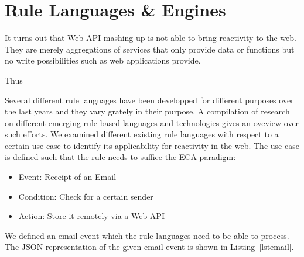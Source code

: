 




\section{Rule Languages \& Engines}

It turns out that Web API mashing up is not able to bring reactivity to the web.
They are merely aggregations of services that only provide data or functions but no write possibilities such as web applications provide.

Thus 





Several different rule languages have been developped for different purposes over the last years and they vary grately in their purpose.
A compilation of research on different emerging rule-based languages and technologies \cite{2009-Paschke_Boley-RCER.pdf} gives an oveview over such efforts.
We examined different existing rule languages with respect to a certain use case to identify its applicability for reactivity in the web. %
The use case is defined such that the rule needs to suffice the ECA paradigm:

\begin{itemize}
  \item Event: Receipt of an Email
  \item Condition: Check for a certain sender
  \item Action: Store it remotely via a Web API
\end{itemize}

We defined an email event which the rule languages need to be able to process.
The JSON representation of the given email event is shown in Listing~\ref{lstemail}.

